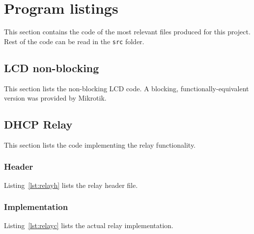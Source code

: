 \newpage
\section{Program listings}
This section contains the code of the most relevant files produced for this project. Rest of the code can be read in the \texttt{src} folder.

\subsection{LCD non-blocking}
This section lists the non-blocking LCD code. A blocking, functionally-equivalent version was provided by Mikrotik.\\


\subsection{DHCP Relay}
This section lists the code implementing the relay functionality.

\subsubsection{Header}
Listing~\ref{lst:relayh} lists the relay header file.\\


\newpage
\subsubsection{Implementation}
Listing~\ref{lst:relayc} lists the actual relay implementation.\\
